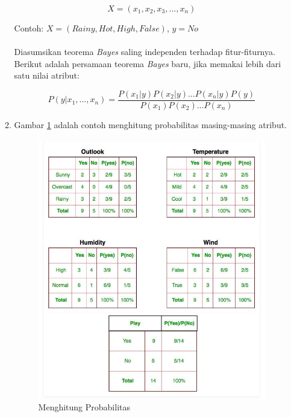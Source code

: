 \documentclass[a4paper,twoside]{article}
\begin{document}
\begin{enumerate}
\begin{enumerate}
\begin{equation}
X = (x_1, x_2, x_3, \ldots, x_n)
\end{equation}

Contoh: $X = (Rainy, Hot, High, False)$, $y = No$
\\\\
Diasumsikan teorema \textit{Bayes} saling independen terhadap fitur-fiturnya. Berikut adalah persamaan teorema \textit{Bayes} baru, jika memakai lebih dari satu nilai atribut:

\begin{equation}
P(y|x_1,\ldots,x_n) = \frac{P(x_1|y) P(x_2|y) \ldots P(x_n|y) P(y)}{P(x_1) P(x_2) \ldots P(x_n)}
\end{equation}


\item Gambar \ref{fig:naive_bayes2} adalah contoh menghitung probabilitas masing-masing atribut.

\begin{figure}[H]
	\centering
	\includegraphics[scale=0.55]{naive_bayes2}
	\caption{Menghitung Probabilitas}
	\label{fig:naive_bayes2}
\end{figure}


\end{enumerate}
\end{enumerate}
\end{document}
